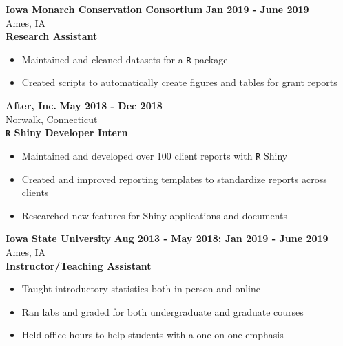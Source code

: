 \documentclass{article}
\newenvironment{innerlist}[1][\enskip\textbullet]%
        {\begin{itemize}[#1,leftmargin=*,parsep=0pt,itemsep=0pt,topsep=0pt,partopsep=0pt]}
        {\end{itemize}}
\begin{document}
\textbf{Iowa Monarch Conservation Consortium} \hfill {\textbf{Jan 2019 - June 2019}} \\
Ames, IA\\
\textbf{Research Assistant}
\begin{innerlist}
  \item Maintained and cleaned datasets for a \verb|R| package
  \item Created scripts to automatically create figures and tables for grant reports \\
\end{innerlist}

\textbf{After, Inc.} \hfill {\textbf{May 2018 - Dec 2018}} \\
Norwalk, Connecticut\\
\textbf{\texttt{R} Shiny Developer Intern}
\begin{innerlist}
  \item Maintained and developed over 100 client reports with \verb|R| Shiny
  \item Created and improved reporting templates to standardize reports across clients
  \item Researched new features for Shiny applications and documents \\
\end{innerlist}

\textbf{Iowa State University} \hfill {\textbf{Aug 2013 - May 2018; Jan 2019 - June 2019}} \\
Ames, IA \\
\textbf{Instructor/Teaching Assistant}
\begin{innerlist}
  \item Taught introductory statistics both in person and online 
  \item Ran labs and graded for both undergraduate and graduate courses 
  \item Held office hours to help students with a one-on-one emphasis
\end{innerlist}
\end{document}
